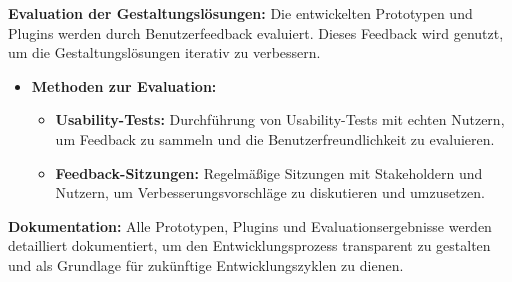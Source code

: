 \textbf{Evaluation der Gestaltungslösungen:}
Die entwickelten Prototypen und Plugins werden durch Benutzerfeedback evaluiert. Dieses Feedback wird genutzt, um die Gestaltungslösungen iterativ zu verbessern.

\begin{itemize}
    \item \textbf{Methoden zur Evaluation:}
    \begin{itemize}
        \item \textbf{Usability-Tests:} Durchführung von Usability-Tests mit echten Nutzern, um Feedback zu sammeln und die Benutzerfreundlichkeit zu evaluieren.
        \item \textbf{Feedback-Sitzungen:} Regelmäßige Sitzungen mit Stakeholdern und Nutzern, um Verbesserungsvorschläge zu diskutieren und umzusetzen.
    \end{itemize}
\end{itemize}

\textbf{Dokumentation:}
Alle Prototypen, Plugins und Evaluationsergebnisse werden detailliert dokumentiert, um den Entwicklungsprozess transparent zu gestalten und als Grundlage für zukünftige Entwicklungszyklen zu dienen.